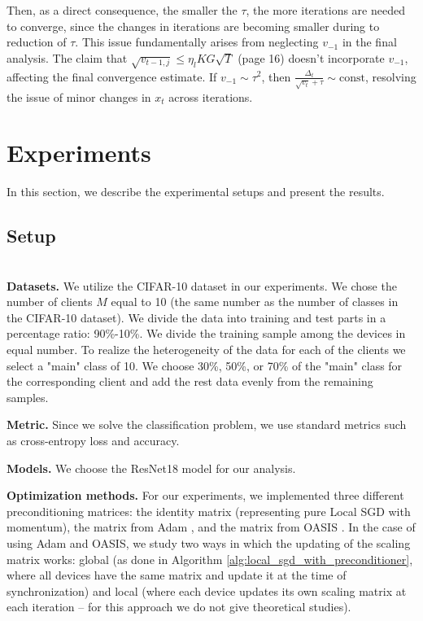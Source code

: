 \documentclass[sn-mathphys,Numbered]{sn-jnl}%
\renewcommand{\|}{\parallel}
\renewcommand {\*} {\ast}
\begin{document}
Then, as a direct consequence, the smaller the $\tau$, the more iterations are needed to converge, since the changes in iterations are becoming smaller during to reduction of $\tau$. 
This issue fundamentally arises from neglecting $v_{-1}$ in the final analysis. 
The claim that $\sqrt{v_{t-1, j}} \leq \eta_l KG\sqrt{T}$ (page 16) doesn't incorporate $v_{-1}$, affecting the final convergence estimate. 
If $v_{-1} \sim \tau^2$, then $\frac{\Delta_t}{\sqrt{v_t} + \tau} \sim \text{const}$, resolving the issue of minor changes in $x_t$ across iterations.



\section{Experiments}
In this section, we describe the experimental setups and present the results.
\label{exper}
\subsection{Setup}
$ \ $\\
\noindent
\hspace{0.55cm}\textbf{Datasets.} 
We utilize the CIFAR-10 dataset \cite{krizhevsky2009learning} in our experiments. We chose the number of clients $M$ equal to 10 (the same number as the number of classes in the CIFAR-10 dataset). We divide the data into training and test parts in a percentage ratio: 90\%-10\%. We divide the training sample among the devices in equal number. To realize the heterogeneity of the data for each of the clients we select a "main" class of 10. We choose 30\%, 50\%, or 70\% of the "main" class for the corresponding client and add the rest data evenly from the remaining samples.
\vskip5pt

\noindent
\textbf{Metric.} Since we solve the classification problem, we use standard metrics such as cross-entropy loss and accuracy.
\vskip5pt

\noindent
\textbf{Models.} We choose the ResNet18 model \cite{he2016deep} for our analysis.
\vskip5pt

\noindent
\textbf{Optimization methods.} 
For our experiments, we implemented three different preconditioning matrices: the identity matrix (representing pure Local SGD with momentum), the matrix from Adam \cite{kingma2014adam}, and the matrix from OASIS \cite{jahani2021doubly}. In the case of using Adam and OASIS, we study two ways in which the updating of the scaling matrix works: global (as done in Algorithm \ref{alg:local_sgd_with_preconditioner}, where all devices have the same matrix and update it at the time of synchronization) and local (where each device updates its own scaling matrix at each iteration -- for this approach we do not give theoretical studies). 
\end{document}
